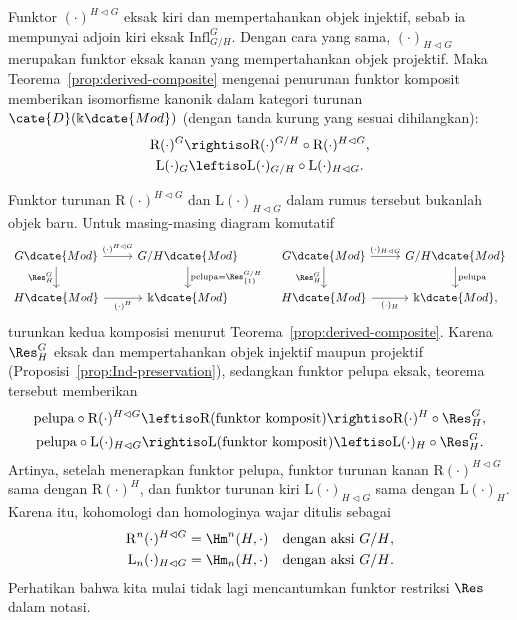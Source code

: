 Funktor $(\cdot)^{H\lhd G}$ eksak kiri dan mempertahankan objek injektif,
sebab ia mempunyai adjoin kiri eksak $\mathrm{Infl}^G_{G/H}$. Dengan cara
yang sama, $(\cdot)_{H\lhd G}$ merupakan funktor eksak kanan yang
mempertahankan objek projektif. Maka Teorema~\ref{prop:derived-composite}
mengenai penurunan funktor komposit memberikan isomorfisme kanonik dalam
kategori turunan $\cate{D}(\Bbbk\dcate{Mod})$ (dengan tanda kurung yang sesuai
dihilangkan):
\begin{equation}\label{eqn:LHS-derived}
	\begin{gathered}
		\mathrm{R}(\cdot)^G\rightiso
		\mathrm{R}(\cdot)^{G/H}\circ\mathrm{R}(\cdot)^{H\lhd G},\\
		\mathrm{L}(\cdot)_G\leftiso
		\mathrm{L}(\cdot)_{G/H}\circ\mathrm{L}(\cdot)_{H\lhd G}.
	\end{gathered}
\end{equation}

Funktor turunan $\mathrm{R}(\cdot)^{H\lhd G}$ dan
$\mathrm{L}(\cdot)_{H\lhd G}$ dalam rumus tersebut bukanlah objek baru.
Untuk masing-masing diagram komutatif
\[\begin{tikzcd}
	G\dcate{Mod} \arrow[r,"{(\cdot)^{H\lhd G}}"]
	\arrow[d,"{\Res^G_H}"'] & G/H\dcate{Mod}
	\arrow[d,"{\text{pelupa}=\Res^{G/H}_{\{1\}}}"]\\
	H\dcate{Mod} \arrow[r,"{(\cdot)^H}"'] & \Bbbk\dcate{Mod}
\end{tikzcd}\quad\begin{tikzcd}
	G\dcate{Mod} \arrow[r,"{(\cdot)_{H\lhd G}}"]
	\arrow[d,"{\Res^G_H}"'] & G/H\dcate{Mod}
	\arrow[d,"\text{pelupa}"]\\
	H\dcate{Mod} \arrow[r,"{(\cdot)_H}"'] & \Bbbk\dcate{Mod},
\end{tikzcd}\]
turunkan kedua komposisi menurut Teorema~\ref{prop:derived-composite}. Karena
$\Res^G_H$ eksak dan mempertahankan objek injektif maupun projektif
(Proposisi~\ref{prop:Ind-preservation}), sedangkan funktor pelupa eksak,
teorema tersebut memberikan
\begin{gather*}
	\text{pelupa}\circ\mathrm{R}(\cdot)^{H\lhd G}
	\leftiso\mathrm{R}(\text{funktor komposit})
	\rightiso\mathrm{R}(\cdot)^H\circ\Res^G_H,\\
	\text{pelupa}\circ\mathrm{L}(\cdot)_{H\lhd G}
	\rightiso\mathrm{L}(\text{funktor komposit})
	\leftiso\mathrm{L}(\cdot)_H\circ\Res^G_H.
\end{gather*}
Artinya, setelah menerapkan funktor pelupa, funktor turunan kanan
$\mathrm{R}(\cdot)^{H\lhd G}$ sama dengan $\mathrm{R}(\cdot)^H$, dan funktor
turunan kiri $\mathrm{L}(\cdot)_{H\lhd G}$ sama dengan
$\mathrm{L}(\cdot)_H$. Karena itu, kohomologi dan homologinya wajar ditulis
sebagai
\begin{align*}
	\mathrm{R}^n(\cdot)^{H\lhd G}
	&=\Hm^n(H,\cdot)\quad\text{dengan aksi $G/H$},\\
	\mathrm{L}_n(\cdot)_{H\lhd G}
	&=\Hm_n(H,\cdot)\quad\text{dengan aksi $G/H$}.
\end{align*}
Perhatikan bahwa kita mulai tidak lagi mencantumkan funktor restriksi $\Res$
dalam notasi.

